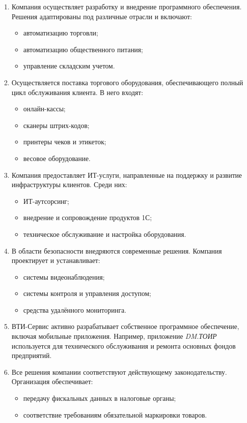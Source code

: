 \begin{enumerate}
  \item Компания осуществляет разработку и внедрение программного обеспечения. Решения адаптированы под различные отрасли и включают:
  \begin{itemize}
    \item автоматизацию торговли;
    \item автоматизацию общественного питания;
    \item управление складским учетом.
  \end{itemize}

  \item Осуществляется поставка торгового оборудования, обеспечивающего полный цикл обслуживания клиента. В него входят:
  \begin{itemize}
    \item онлайн-кассы;
    \item сканеры штрих-кодов;
    \item принтеры чеков и этикеток;
    \item весовое оборудование.
  \end{itemize}

  \item Компания предоставляет ИТ-услуги, направленные на поддержку и развитие инфраструктуры клиентов. Среди них:
  \begin{itemize}
    \item ИТ-аутсорсинг;
    \item внедрение и сопровождение продуктов 1С;
    \item техническое обслуживание и настройка оборудования.
  \end{itemize}

  \item В области безопасности внедряются современные решения. Компания проектирует и устанавливает:
  \begin{itemize}
    \item системы видеонаблюдения;
    \item системы контроля и управления доступом;
    \item средства удалённого мониторинга.
  \end{itemize}

  \item ВТИ-Сервис активно разрабатывает собственное программное обеспечение, включая мобильные приложения. Например, приложение \textit{DM.ТОИР} используется для технического обслуживания и ремонта основных фондов предприятий.

  \item Все решения компании соответствуют действующему законодательству. Организация обеспечивает:
  \begin{itemize}
    \item передачу фискальных данных в налоговые органы;
    \item соответствие требованиям обязательной маркировки товаров.
  \end{itemize}
\end{enumerate}
